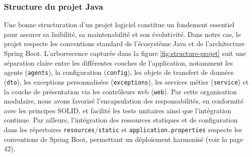 \documentclass[12pt,a4paper]{report}
\begin{document}
	\subsubsection{Structure du projet Java}
	
	Une bonne structuration d’un projet logiciel constitue un fondement essentiel pour assurer sa lisibilité, sa maintenabilité et son évolutivité. Dans notre cas, le projet respecte les conventions standard de l’écosystème Java et de l’architecture Spring Boot. L’arborescence capturée dans la figure \ref{fig:structure-projet} suit une séparation claire entre les différentes couches de l’application, notamment les agents (\verb|agents|), la configuration (\verb|config|), les objets de transfert de données (\verb|dto|), les exceptions personnalisées (\verb|exceptions|), les services métier (\verb|service|) et la couche de présentation via les contrôleurs web (\verb|web|). Par cette organisation modulaire, nous avons favorisé l'encapsulation des responsabilités, en conformité avec les principes SOLID, et facilité les tests unitaires ainsi que l’intégration continue. Par ailleurs, l’intégration des ressources statiques et de configuration dans les répertoires \verb|resources|/\verb|static| et \verb|application.properties| respecte les conventions de Spring Boot, permettant un déploiement harmonisé (voir la page 42).
	
\end{document}
